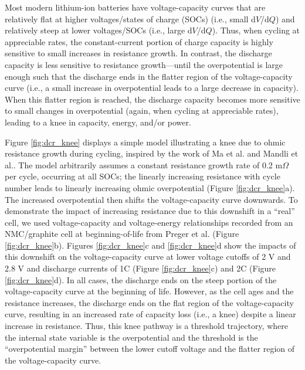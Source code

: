 \documentclass[journal=jpclcd,manuscript=article]{achemso}
\begin{document}
Most modern lithium-ion batteries have voltage-capacity curves that are relatively flat at higher voltages/states of charge (SOCs) (i.e., small d$V$/d$Q$) and relatively steep at lower voltages/SOCs (i.e., large d$V$/d$Q$). Thus, when cycling at appreciable rates, the constant-current portion of charge capacity is highly sensitive to small increases in resistance growth. In contrast, the discharge capacity is less sensitive to resistance growth---until the overpotential is large enough such that the discharge ends in the flatter region of the voltage-capacity curve (i.e., a small increase in overpotential leads to a large decrease in capacity). When this flatter region is reached, the discharge capacity becomes more sensitive to small changes in overpotential (again, when cycling at appreciable rates), leading to a knee in capacity, energy, and/or power.

Figure \ref{fig:dcr_knee} displays a simple model illustrating a knee due to ohmic resistance growth during cycling, inspired by the work of Ma et al.\cite{ma_editors_2019} and Mandli et al.\cite{mandli_analysis_2019}. The model arbitrarily assumes a constant resistance growth rate of 0.2 m$\Omega$ per cycle, occurring at all SOCs; the linearly increasing resistance with cycle number leads to linearly increasing ohmic overpotential (Figure \ref{fig:dcr_knee}a). The increased overpotential then shifts the voltage-capacity curve downwards.
To demonstrate the impact of increasing resistance due to this downshift in a ``real'' cell, we used voltage-capacity and voltage-energy relationships recorded from an NMC/graphite cell at beginning-of-life from Preger et al.\cite{preger_degradation_2020} (Figure \ref{fig:dcr_knee}b). Figures \ref{fig:dcr_knee}c and \ref{fig:dcr_knee}d show the impacts of this downshift on the voltage-capacity curve at lower voltage cutoffs of 2 V and 2.8 V and discharge currents of 1C (Figure \ref{fig:dcr_knee}c) and 2C (Figure \ref{fig:dcr_knee}d). In all cases, the discharge ends on the steep portion of the voltage-capacity curve at the beginning of life. However, as the cell ages and the resistance increases, the discharge ends on the flat region of the voltage-capacity curve, resulting in an increased rate of capacity loss (i.e., a knee) despite a linear increase in resistance. Thus, this knee pathway is a threshold trajectory, where the internal state variable is the overpotential and the threshold is the ``overpotential margin'' between the lower cutoff voltage and the flatter region of the voltage-capacity curve.
\end{document}
